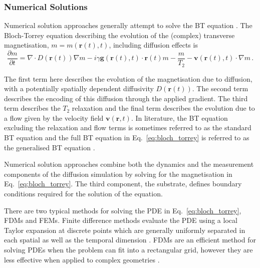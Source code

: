 \subsubsection{Numerical Solutions}
\label{sec:numerical_solutions}
Numerical solution approaches generally attempt to solve the \ac{BT} equation \cite{Torrey1956}.
The \acl{Bloch-Torrey} equation describing the evolution of the (complex) transverse magnetisation, $m = m(\mathbf{r}(t), t)$, including diffusion effects is
\begin{equation}
  \frac{\partial m}{\partial t} = \nabla\cdot D(\mathbf{r}(t))\nabla m -i \gamma \mathbf{g}(\mathbf{r}(t), t)\cdot \mathbf{r}(t) m  - \frac{m}{T_2} - \mathbf{v}(\mathbf{r}(t), t) \cdot \nabla m\,.
  \label{eq:bloch_torrey}
\end{equation}

The first term here describes the evolution of the magnetisation due to diffusion, with a potentially spatially dependent diffusivity $D(\mathbf{r}(t))$. The second term describes the encoding of this diffusion through the applied gradient. The third term describes the $T_2$ relaxation and the final term describes the evolution due to a flow given by the velocity field $\mathbf{v}(\mathbf{r}, t)$.
In literature, the \ac{BT} equation excluding the relaxation and flow terms is sometimes referred to as the standard \ac{BT} equation and the full \ac{BT} equation in Eq.\ \ref{eq:bloch_torrey} is referred to as the generalised \ac{BT} equation \cite{Beltrachini2016}. 

Numerical solution approaches combine both the dynamics and the measurement components of the diffusion simulation by solving for the magnetisation in  Eq.\ \ref{eq:bloch_torrey}.
The third component, the substrate, defines boundary conditions required for the solution of the equation. 

There are two typical methods for solving the \ac{PDE} in Eq.\ \ref{eq:bloch_torrey}, \acp{FDM} and \acp{FEM}.
Finite difference methods evaluate the \ac{PDE} using a local Taylor expansion at discrete points which are generally uniformly separated in each spatial as well as the temporal dimension \cite{Grossmann2007}.
\acp{FDM} are an efficient method for solving \acp{PDE} when the problem can fit into a rectangular grid, however they are less effective when applied to complex geometries \cite{Hagslatt2003, Grossmann2007}.

